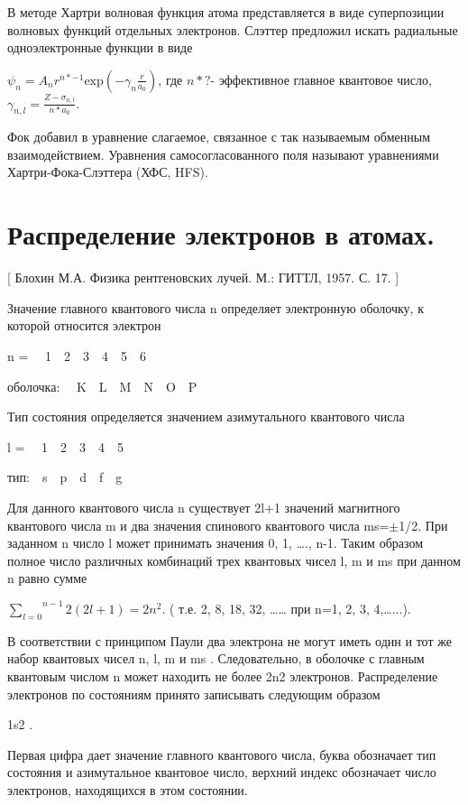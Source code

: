 \documentclass[a4paper,14pt, openany, twoside, draft]{extbook} %
\begin{document}
В методе Хартри волновая функция атома представляется в виде суперпозиции волновых функций отдельных электронов. Слэттер предложил искать радиальные одноэлектронные функции в виде

 $\psi _n=A_nr^{n\ast -1}\text{exp}(-\gamma _n\frac r{a_0})$, где  $n\ast ?${}- эффективное главное квантовое число,  $\gamma _{n,l}=\frac{Z-\sigma _{n,l}}{n\ast a_0}$.

Фок добавил в уравнение слагаемое, связанное с так называемым обменным взаимодействием. Уравнения самосогласованного поля называют уравнениями Хартри-Фока-Слэттера (ХФС, HFS).

\section{Распределение электронов в атомах.}
\label{sec:electron-in-athoms}

[ Блохин М.А. Физика рентгеновских лучей. М.: ГИТТЛ, 1957. С. 17. ]

Значение главного квантового числа n определяет электронную оболочку, к которой относится электрон

n = \ \ 1\ \ 2\ \ 3\ \ 4\ \ 5\ \ 6

оболочка: \ \ K\ \ L\ \ M\ \ N\ \ O\ \ P

Тип состояния определяется значением азимутального квантового числа

l = \ \ 1\ \ 2\ \ 3\ \ 4\ \ 5

тип:\ \ s\ \ p\ \ d\ \ f\ \ g\ \

Для данного квантового числа n  существует 2l+1 значений магнитного квантового числа m и два значения спинового квантового числа ms=${\pm}$1/2. При заданном n число l может принимать значения 0, 1, …., n{}-1. Таким образом полное число различных комбинаций трех квантовых чисел l, m и ms при данном n равно сумме

 $\overset{n-1}{\underset{l=0}{\sum }}2(2l+1)=2n^2$.  ( т.е. 2, 8, 18, 32, …… при n=1, 2, 3, 4,…...).

В соответствии с принципом Паули два электрона не могут иметь один и тот же набор квантовых чисел  n, l, m и ms . Следовательно, в оболочке с главным квантовым числом n может находить не более 2n2 электронов. Распределение электронов по состояниям принято записывать следующим образом

1s2 .

Первая цифра дает значение главного квантового числа, буква обозначает тип состояния и азимутальное квантовое число, верхний индекс обозначает число электронов, находящихся в этом состоянии.
\end{document}
